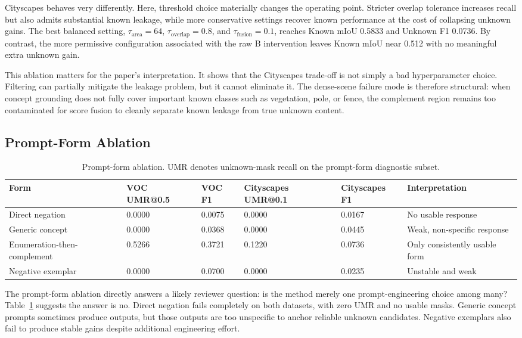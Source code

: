 \documentclass[a4paper,fleqn]{cas-dc}
\begin{document}
Cityscapes behaves very differently. Here, threshold choice materially changes the operating point. Stricter overlap tolerance increases recall but also admits substantial known leakage, while more conservative settings recover known performance at the cost of collapsing unknown gains. The best balanced setting, $\tau_{\text{area}}=64$, $\tau_{\text{overlap}}=0.8$, and $\tau_{\text{fusion}}=0.1$, reaches Known mIoU 0.5833 and Unknown F1 0.0736. By contrast, the more permissive configuration associated with the raw B intervention leaves Known mIoU near 0.512 with no meaningful extra unknown gain.

This ablation matters for the paper's interpretation. It shows that the Cityscapes trade-off is not simply a bad hyperparameter choice. Filtering can partially mitigate the leakage problem, but it cannot eliminate it. The dense-scene failure mode is therefore structural: when concept grounding does not fully cover important known classes such as vegetation, pole, or fence, the complement region remains too contaminated for score fusion to cleanly separate known leakage from true unknown content.

\subsection{Prompt-Form Ablation}
\label{sec:exp:prompt}

\begin{table}[!t]
  \caption{Prompt-form ablation. UMR denotes unknown-mask recall on the prompt-form diagnostic subset.}
  \label{tab:prompt}
  \centering
  \begin{tabular}{llllll}
    \toprule
    Form & VOC UMR@0.5 & VOC F1 & Cityscapes UMR@0.1 & Cityscapes F1 & Interpretation \\
    \midrule
    Direct negation & 0.0000 & 0.0075 & 0.0000 & 0.0167 & No usable response \\
    Generic concept & 0.0000 & 0.0368 & 0.0000 & 0.0445 & Weak, non-specific response \\
    Enumeration-then-complement & 0.5266 & 0.3721 & 0.1220 & 0.0736 & Only consistently usable form \\
    Negative exemplar & 0.0000 & 0.0700 & 0.0000 & 0.0235 & Unstable and weak \\
    \bottomrule
  \end{tabular}
\end{table}

The prompt-form ablation directly answers a likely reviewer question: is the method merely one prompt-engineering choice among many? Table~\ref{tab:prompt} suggests the answer is no. Direct negation fails completely on both datasets, with zero UMR and no usable masks. Generic concept prompts sometimes produce outputs, but those outputs are too unspecific to anchor reliable unknown candidates. Negative exemplars also fail to produce stable gains despite additional engineering effort.
\end{document}
